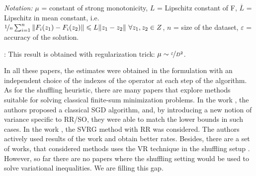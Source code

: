 \documentclass{article}
\newcommand{\red}{\color{mydarkred}}
\begin{document}
\begin{table}
{\begin{threeparttable}
\begin{tablenotes}
    \item [] {\em Notation:} $\mu$ = constant of strong monotonicity, $L$ = Lipschitz constant of F, $\overline{L}$ = Lipschitz in mean constant, i.e. $\nicefrac{1}{n}\sum\nolimits_{i=1}^n \|F_i(z_1) - F_i(z_2)\| \leqslant L \|z_1 - z_2\| ~\forall z_1, z_2 \in Z$, $n$ =  size of the dataset, $\varepsilon$ = accuracy of the solution.
    \item [] {\red{(1)}}: This result is obtained with regularization trick: $\mu \sim \nicefrac{\varepsilon}{D^2}$.
\end{tablenotes}    
\end{threeparttable}
}
\vspace{-6mm}
\end{table}

\vspace{-1mm}
In all these papers, the estimates were obtained in the formulation with an independent choice of the indexes of the operator at each step of the algorithm. As for the shuffling heuristic, there are many papers that explore methods suitable for solving classical finite-sum minimization problems. In the work \citep{mishchenko2020random}, the authors proposed a classical \textsc{SGD} algorithm, and, by introducing a new notion of variance specific to
RR/SO, they were able to match the lower bounds in such cases. In the work \citep{malinovsky2023random}, the \textsc{SVRG} method with RR was considered. The authors actively used results of the work \citep{mishchenko2020random} and obtain better rates. Besides, there are a set of works, that considered methods uses the VR technique in the shuffling setup \citep{huang2021improved, mokhtari2018surpassing, ying2020variance}. However, so far there are no papers where the shuffling setting would be used to solve variational inequalities. We are filling this gap.
\end{document}

